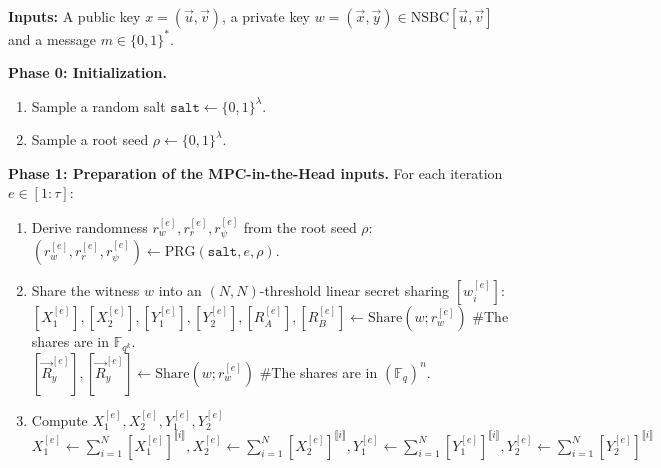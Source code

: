\documentclass[english]{article}
\begin{document}
		\begin{tcolorbox}[title=Protocol 15: Signing Algorithm, breakable, enhanced, colback=white, colframe=black]
			\textbf{Inputs:} A public key $x = (\vec{u}, \vec{v})$, a private key $w = (\vec{x}, \vec{y}) \in \text{NSBC}[\vec{u}, \vec{v}]$ and a message $m \in \{0,1\}^*$.
			
			\vspace{0.5em}
			\textbf{Phase 0: Initialization.}
			\begin{enumerate}[label=\arabic*.]
				\item Sample a random salt $\texttt{salt} \leftarrow \{0,1\}^{\lambda}$.
				\item Sample a root seed $\rho \leftarrow \{0,1\}^{\lambda}$.
			\end{enumerate}
			
			\vspace{0.5em}
			\textbf{Phase 1: Preparation of the MPC-in-the-Head inputs.} For each iteration $e \in [1:\tau]$:
			\begin{enumerate}[label=\arabic*.]
				\item Derive randomness $r^{[e]}_{w}, r^{[e]}_r, r^{[e]}_{\psi}$ from the root seed $\rho$: \\
				\quad $(r^{[e]}_w, r^{[e]}_r, r^{[e]}_{\psi}) \leftarrow \text{PRG}(\texttt{salt}, e, \rho)$.
				
				\item Share the witness $w$ into an $(N, N)$-threshold linear secret sharing $[w^{[e]}_i]$: \\
				\quad $[X_1^{[e]}], [X_2^{[e]}], [Y_1^{[e]}], [Y_2^{[e]}], [R_A^{[e]}], [R_B^{[e]}] \leftarrow \text{Share}(w; r^{[e]}_w)$ \#The shares are in $\mathbb{F}_{q^k}$. \\
				\quad $[\vec{R}_y^{[e]}], [\vec{R}_y^{[e]}] \leftarrow \text{Share}(w; r^{[e]}_w)$ \#The shares are in $(\mathbb{F}_{q})^n$.
				
				\item Compute $X_1^{[e]}, X_2^{[e]}, Y_1^{[e]}, Y_2^{[e]}$ \\
				\quad $X_1^{[e]} \leftarrow \sum_{i=1}^{N} [X_1^{[e]}]^{\llbracket i \rrbracket}, X_2^{[e]} \leftarrow \sum_{i=1}^{N} [X_2^{[e]}]^{\llbracket i \rrbracket}, Y_1^{[e]} \leftarrow \sum_{i=1}^{N} [Y_1^{[e]}]^{\llbracket i \rrbracket}, Y_2^{[e]} \leftarrow \sum_{i=1}^{N} [Y_2^{[e]}]^{\llbracket i \rrbracket}$
				

\end{enumerate}
\end{tcolorbox}
\end{document}

